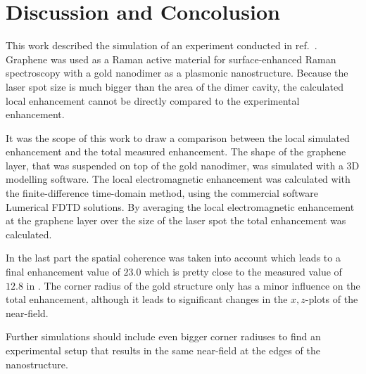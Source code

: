 \newpage
\section{Discussion and Concolusion}

This work described the simulation of an experiment conducted in ref.~\cite{heeg}. Graphene was used as a Raman active material for surface-enhanced Raman spectroscopy with a gold nanodimer as a plasmonic nanostructure. Because the laser spot size is much bigger than the area of the dimer cavity, the calculated local enhancement cannot be directly compared to the experimental enhancement.

It was the scope of this work to draw a comparison between the local simulated enhancement and the total measured enhancement. The shape of the graphene layer, that was suspended on top of the gold nanodimer, was simulated with a 3D modelling software. The local electromagnetic enhancement was calculated with the finite-difference time-domain method, using the commercial software Lumerical FDTD solutions. By averaging the local electromagnetic enhancement at the graphene layer over the size of the laser spot the total enhancement was calculated.

 In the last part the spatial coherence was taken into account which leads to a final enhancement value of $23.0$ which is pretty close to the measured value of $12.8$ in \cite{heeg}. The corner radius of the gold structure only has a minor influence on the total enhancement, although it leads to significant changes in the $x,z$-plots of the near-field. 


Further simulations should include even bigger corner radiuses to find an experimental setup that results in the same near-field at the edges of the nanostructure.
